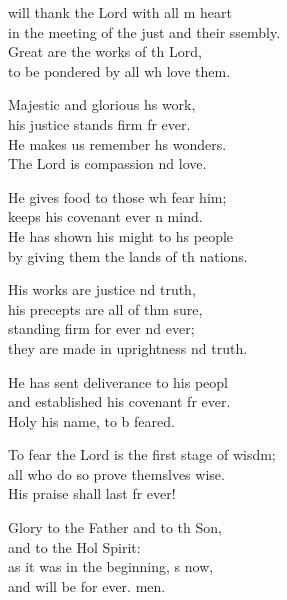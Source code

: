 \settowidth{\versewidth}{To fear the Lord is the first stage of wisdom; +}
\begin{psalmverse}%
  \begin{patverse}
 will thank the Lord with all m heart\Med\\
    in the meeting of the just and their ssembly.\\
Great are the works of th Lord,\Med\\
    to be pondered by all wh love them.

Majestic and glorious h\pointup{\i}s work,\Med\\
    his justice stands firm fr ever.\\
He makes us remember h\pointup{\i}s wonders.\Med\\
    The Lord is compassion nd love.

He gives food to those wh fear him;\Med\\
    keeps his covenant ever \pointup{\i}n mind.\\
He has shown his might to h\pointup{\i}s people\Med\\
    by giving them the lands of th nations.

His works are justice nd truth,\Med\\
    his precepts are all of thm sure,\\
standing firm for ever nd ever;\Med\\
    they are made in uprightness nd truth.

He has sent deliverance to his peopl\Flex\\
    and established his covenant fr ever.\Med\\
    Holy his name, to b feared.

To fear the Lord is the first stage of wisdm;\Flex\\
    all who do so prove themslves wise.\Med\\
His praise shall last fr ever!

Glory to the Father and to th Son,\Med\\
    and to the Hol Spirit:\\
as it was in the beginning, \pointup{\i}s now,\Med\\
    and will be for ever. men.
  \end{patverse}
\end{psalmverse}
